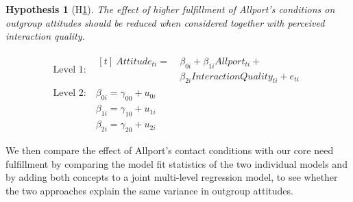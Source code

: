 \documentclass[man, 12pt, a4paper, mask]{apa7}
\theoremstyle{break}
\theoremstyle{plain}
\newtheorem{subhyp}{Hypothesis}
\begin{document}
\begin{mdframed}[style=mdfhypothesis]
    \begin{subhyp}[H\ref{hyp:AttAllportQual}] \label{hyp:AttAllportQual}
    \addtolength{\leftskip}{\subhypskip}
    The effect of higher fulfillment of Allport's conditions on outgroup attitudes should be reduced when considered together with perceived interaction quality.
    \end{subhyp}

    \begin{fleqn}[\eqskip]
      \begin{equation} \label{eq:SlopesAttAllportQual}
        \begin{split}
          \textrm{Level 1:} &
            \begin{aligned}[t]
              \ Attitude_{ti} =  &\ \beta_{0i} + \beta_{1i}Allport_{ti} + \\
                                 &\ \beta_{2i}InteractionQuality_{ti} + e_{ti}
            \end{aligned} \\
          \textrm{Level 2:} &\ \beta_{0i} = \gamma_{00} + u_{0i} \\
                            &\ \beta_{1i} = \gamma_{10} + u_{1i} \\
                            &\ \beta_{2i} = \gamma_{20} + u_{2i}
        \end{split} 
      \end{equation}
    \end{fleqn}
\end{mdframed}

We then compare the effect of Allport's contact conditions with our core need fulfillment by comparing the model fit statistics of the two individual models and by adding both concepts to a joint multi-level regression model, to see whether the two approaches explain the same variance in outgroup attitudes.
\end{document}
